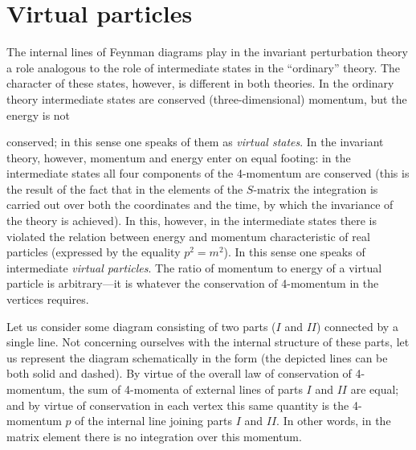 \section{Virtual particles}

The internal lines of Feynman diagrams play in the invariant perturbation theory a role analogous to the role of intermediate states in the ``ordinary'' theory. The character of these states, however, is different in both theories. In the ordinary theory intermediate states are conserved (three-dimensional) momentum, but the energy is not

conserved; in this sense one speaks of them as \textit{virtual states}. In the invariant theory, however, momentum and energy enter on equal footing: in the intermediate states all four components of the 4-momentum are conserved (this is the result of the fact that in the elements of the $S$-matrix the integration is carried out over both the coordinates and the time, by which the invariance of the theory is achieved). In this, however, in the intermediate states there is violated the relation between energy and momentum characteristic of real particles (expressed by the equality $p^2 = m^2$). In this sense one speaks of intermediate \textit{virtual particles}. The ratio of momentum to energy of a virtual particle is arbitrary---it is whatever the conservation of 4-momentum in the vertices requires.

Let us consider some diagram consisting of two parts ($I$ and $II$) connected by a single line. Not concerning ourselves with the internal structure of these parts, let us represent the diagram schematically in the form
(the depicted lines can be both solid and dashed). By virtue of the overall law of conservation of 4-momentum, the sum of 4-momenta of external lines of parts $I$ and $II$ are equal; and by virtue of conservation in each vertex this same quantity is the 4-momentum $p$ of the internal line joining parts $I$ and $II$. In other words, in the matrix element there is no integration over this momentum.

